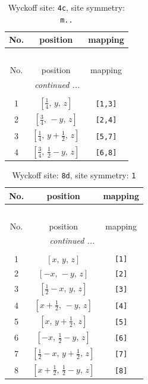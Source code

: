 \documentclass[fleqn,8pt]{jsarticle}
\begin{document}
\renewcommand{\arraystretch}{1.2}
\begin{longtable}{ccc}
\caption{Wyckoff site: {\tt 4c}, site symmetry: {\tt m..}}
 \\
 \hline \hline
No. & position & mapping \\ \hline \endfirsthead

\multicolumn{2}{l}{\tablename\ \thetable{}} \\
 \hline \hline
No. & position & mapping \\ \hline \endhead

 \hline \hline
\multicolumn{2}{r}{\footnotesize\it continued ...} \\ \endfoot

 \hline \hline
\multicolumn{2}{r}{} \\ \endlastfoot

1 & $\left[ \frac{1}{4},\, y,\, z \right]$ & {\tt [1,3]} \\ \hline
2 & $\left[ \frac{3}{4},\, - y,\, z \right]$ & {\tt [2,4]} \\ \hline
3 & $\left[ \frac{1}{4},\, y + \frac{1}{2},\, z \right]$ & {\tt [5,7]} \\ \hline
4 & $\left[ \frac{3}{4},\, \frac{1}{2} - y,\, z \right]$ & {\tt [6,8]} \\
\end{longtable}
\renewcommand{\arraystretch}{1.2}
\begin{longtable}{ccc}
\caption{Wyckoff site: {\tt 8d}, site symmetry: {\tt 1}}
 \\
 \hline \hline
No. & position & mapping \\ \hline \endfirsthead

\multicolumn{2}{l}{\tablename\ \thetable{}} \\
 \hline \hline
No. & position & mapping \\ \hline \endhead

 \hline \hline
\multicolumn{2}{r}{\footnotesize\it continued ...} \\ \endfoot

 \hline \hline
\multicolumn{2}{r}{} \\ \endlastfoot

1 & $\left[ x,\, y,\, z \right]$ & {\tt [1]} \\ \hline
2 & $\left[ - x,\, - y,\, z \right]$ & {\tt [2]} \\ \hline
3 & $\left[ \frac{1}{2} - x,\, y,\, z \right]$ & {\tt [3]} \\ \hline
4 & $\left[ x + \frac{1}{2},\, - y,\, z \right]$ & {\tt [4]} \\ \hline
5 & $\left[ x,\, y + \frac{1}{2},\, z \right]$ & {\tt [5]} \\ \hline
6 & $\left[ - x,\, \frac{1}{2} - y,\, z \right]$ & {\tt [6]} \\ \hline
7 & $\left[ \frac{1}{2} - x,\, y + \frac{1}{2},\, z \right]$ & {\tt [7]} \\ \hline
8 & $\left[ x + \frac{1}{2},\, \frac{1}{2} - y,\, z \right]$ & {\tt [8]} \\
\end{longtable}
\end{document}
